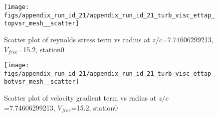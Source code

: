 \begin{figure}[H]
\centering
\texttt{[image: figs/appendix\_run\_id\_21/appendix\_run\_id\_21\_turb\_visc\_ettap\_topvsr\_mesh\_\_scatter]}
\caption{Scatter plot of reynolds stress term vs radius at $z/c$=7.74606299213, $V_{free}$=15.2, station0}
\label{fig:appendix_run_id_21_turb_visc_ettap_topvsr_mesh__scatter}
\end{figure}


\begin{figure}[H]
\centering
\texttt{[image: figs/appendix\_run\_id\_21/appendix\_run\_id\_21\_turb\_visc\_ettap\_botvsr\_mesh\_\_scatter]}
\caption{Scatter plot of velocity gradient term vs radius at $z/c$=7.74606299213, $V_{free}$=15.2, station0}
\label{fig:appendix_run_id_21_turb_visc_ettap_botvsr_mesh__scatter}
\end{figure}


